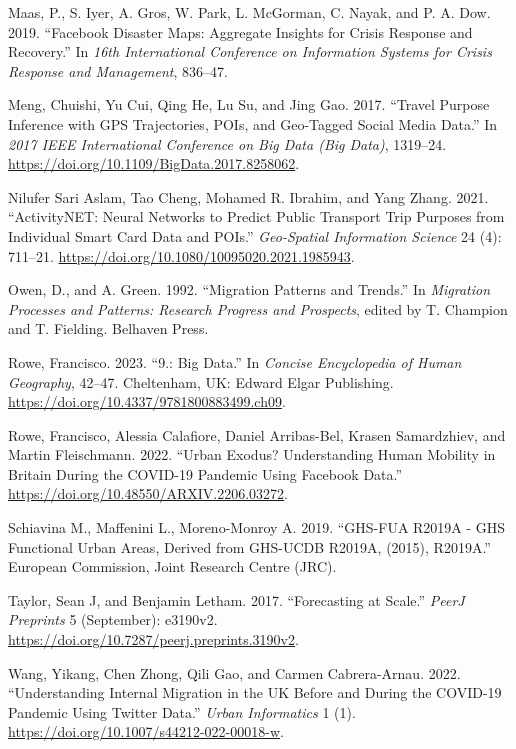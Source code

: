 \documentclass[
  11pt,
]{article}
\newlength{\cslhangindent}
\newlength{\cslentryspacingunit} %
\newenvironment{CSLReferences}[2] %
 {%
  \setlength{\parindent}{0pt}
  \ifodd #1
  \let\oldpar\par
  \def\par{\hangindent=\cslhangindent\oldpar}
  \fi
  \setlength{\parskip}{#2\cslentryspacingunit}
 }%
 {}
\begin{document}
\begin{CSLReferences}{1}{0}
\leavevmode{}%
Maas, P., S. Iyer, A. Gros, W. Park, L. McGorman, C. Nayak, and P. A.
Dow. 2019. {``Facebook Disaster Maps: Aggregate Insights for Crisis
Response and Recovery.''} In \emph{16th International Conference on
Information Systems for Crisis Response and Management}, 836--47.

\leavevmode{}%
Meng, Chuishi, Yu Cui, Qing He, Lu Su, and Jing Gao. 2017. {``Travel
Purpose Inference with GPS Trajectories, POIs, and Geo-Tagged Social
Media Data.''} In \emph{2017 IEEE International Conference on Big Data
(Big Data)}, 1319--24.
\url{https://doi.org/10.1109/BigData.2017.8258062}.

\leavevmode{}%
Nilufer Sari Aslam, Tao Cheng, Mohamed R. Ibrahim, and Yang Zhang. 2021.
{``ActivityNET: Neural Networks to Predict Public Transport Trip
Purposes from Individual Smart Card Data and POIs.''} \emph{Geo-Spatial
Information Science} 24 (4): 711--21.
\url{https://doi.org/10.1080/10095020.2021.1985943}.

\leavevmode{}%
Owen, D., and A. Green. 1992. {``Migration Patterns and Trends.''} In
\emph{Migration Processes and Patterns: Research Progress and
Prospects}, edited by T. Champion and T. Fielding. Belhaven Press.

\leavevmode{}%
Rowe, Francisco. 2023. {``9.: Big Data.''} In \emph{Concise Encyclopedia
of Human Geography}, 42--47. Cheltenham, UK: Edward Elgar Publishing.
\url{https://doi.org/10.4337/9781800883499.ch09}.

\leavevmode{}%
Rowe, Francisco, Alessia Calafiore, Daniel Arribas-Bel, Krasen
Samardzhiev, and Martin Fleischmann. 2022. {``Urban Exodus?
Understanding Human Mobility in Britain During the COVID-19 Pandemic
Using Facebook Data.''} \url{https://doi.org/10.48550/ARXIV.2206.03272}.

\leavevmode{}%
Schiavina M., Maffenini L., Moreno-Monroy A. 2019. {``GHS-FUA R2019A -
GHS Functional Urban Areas, Derived from GHS-UCDB R2019A, (2015),
R2019A.''} European Commission, Joint Research Centre (JRC).

\leavevmode{}%
Taylor, Sean J, and Benjamin Letham. 2017. {``Forecasting at Scale.''}
\emph{PeerJ Preprints} 5 (September): e3190v2.
\url{https://doi.org/10.7287/peerj.preprints.3190v2}.

\leavevmode{}%
Wang, Yikang, Chen Zhong, Qili Gao, and Carmen Cabrera-Arnau. 2022.
{``Understanding Internal Migration in the UK Before and During the
COVID-19 Pandemic Using Twitter Data.''} \emph{Urban Informatics} 1 (1).
\url{https://doi.org/10.1007/s44212-022-00018-w}.

\end{CSLReferences}
\end{document}
